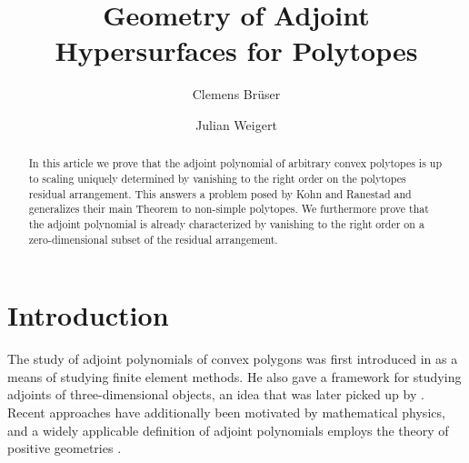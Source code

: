 \documentclass[a4paper,10pt]{amsart}
\title[Geometry of Adjoint Hypersurfaces]{Geometry of Adjoint Hypersurfaces for Polytopes}
\author{Clemens Brüser}
\author{Julian Weigert}
\theoremstyle{definition}
\theoremstyle{plain}
\begin{document}


\begin{abstract}
 In this article we prove that the adjoint polynomial of arbitrary convex polytopes is up to scaling uniquely determined by vanishing to the right order on the polytopes residual arrangement. This answers a problem posed by Kohn and Ranestad \cite[Problem 2]{KohnRanestad2019AdjCurves} and generalizes their main Theorem \cite[Theorem 1]{KohnRanestad2019AdjCurves} to non-simple polytopes. We furthermore prove that the adjoint polynomial is already characterized by vanishing to the right order on a zero-dimensional subset of the residual arrangement.
\end{abstract}
\maketitle

\section{Introduction}

The study of adjoint polynomials of convex polygons was first introduced in \cite{Wachspress1975Adjoints} as a means of studying finite element methods. He also gave a framework for studying adjoints of three-dimensional objects, an idea that was later picked up by \cite{Warren1996Adjoints}. Recent approaches have additionally been motivated by mathematical physics, and a widely applicable definition of adjoint polynomials employs the theory of positive geometries \cite{ArkanihamedBaiLam2017PosGeom, Gaetz2020Adjoints, Lam2022PosGeom}.
\end{document}
